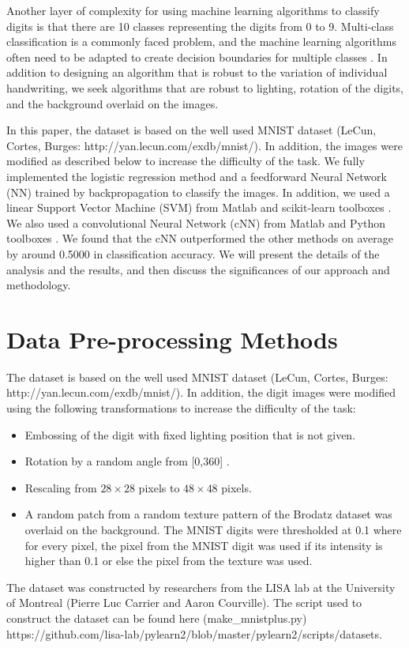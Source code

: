 \documentclass[conference]{IEEEtran}
\begin{document}
Another layer of complexity for using machine learning algorithms to classify digits is that there are 10 classes representing the digits from 0 to 9. Multi-class classification is a commonly faced problem, and the machine learning algorithms often need to be adapted to create decision boundaries for multiple classes \cite{bishop2006pattern}. In addition to designing an algorithm that is robust to the variation of individual handwriting, we seek algorithms that are robust to lighting, rotation of the digits, and the background overlaid on the images.

In this paper, the dataset is based on the well used MNIST dataset (LeCun, Cortes, Burges: http://yan.lecun.com/exdb/mnist/). In addition, the images were modified as described below to increase the difficulty of the task. We fully implemented the logistic regression method and a feedforward Neural Network (NN) trained by backpropagation to classify the images. In addition, we used a linear Support Vector Machine (SVM) from Matlab and scikit-learn toolboxes \cite{scikit-learn}. We also used a convolutional Neural Network (cNN) from Matlab \cite{IMM2012-06284} and Python toolboxes \cite{jia2014caffe}. We found that the cNN outperformed the other methods on average by around 0.5000 in classification accuracy. We will present the details of the analysis and the results, and then discuss the significances of our approach and methodology.

\section{Data Pre-processing Methods}
The dataset is based on the well used MNIST dataset (LeCun, Cortes, Burges: http://yan.lecun.com/exdb/mnist/). In addition, the digit images were modified using the following transformations to increase the difficulty of the task:
\begin{itemize}
\item Embossing of the digit with fixed lighting position that is not given.
\item Rotation by a random angle from [0,360] \degree.
\item Rescaling from $28 \times 28$ pixels to $48 \times 48$ pixels.
\item A random patch from a random texture pattern of the Brodatz dataset \cite{vn526306} was overlaid on the background. The MNIST digits were thresholded at 0.1 where for every pixel, the pixel from the MNIST digit was used if its intensity is higher than 0.1 or else the pixel from the texture was used.
\end{itemize}
The dataset was constructed by researchers from the LISA lab at the University of Montreal (Pierre Luc Carrier and Aaron Courville). The script used to construct the dataset can be found here (make\_mnistplus.py)\\
{\scriptsize https://github.com/lisa-lab/pylearn2/blob/master/pylearn2/scripts/datasets}.
\end{document}
